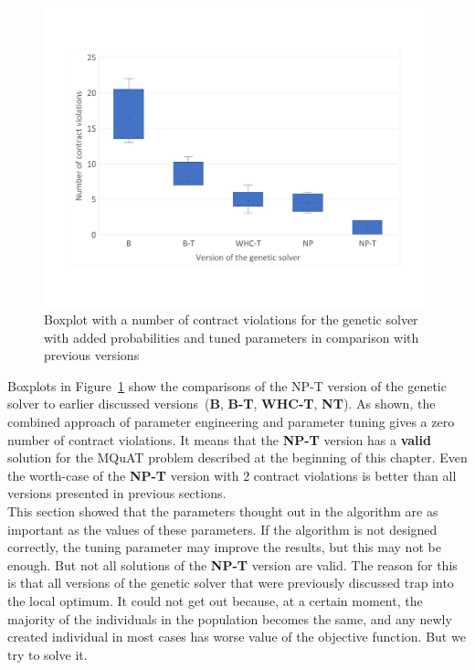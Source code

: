 \begin{figure}
	\centering
	\includegraphics[width=\textwidth]{images/BoxPlotSolverNewParametersTuning.pdf}
	\caption[Boxplot with a number of contract violations for the genetic solver with added probabilities and tuned parameters in comparison with previous versions]{Boxplot with a number of contract violations for the genetic solver with added probabilities and tuned parameters in comparison with previous versions}
	\label{fig:boxplotsolverNewParametersTuning}
\end{figure}

Boxplots in Figure~\ref{fig:boxplotsolverNewParametersTuning} show the comparisons of the NP-T version of the genetic solver to earlier discussed versions~(\textbf{B}, \textbf{B-T}, \textbf{WHC-T}, \textbf{NT}). As shown, the combined approach of parameter engineering and parameter tuning gives a zero number of contract violations. It means that the \textbf{NP-T} version has a \textbf{valid} solution for the MQuAT problem described at the beginning of this chapter. Even the worth-case of the \textbf{NP-T} version with 2 contract violations is better than all versions presented in previous sections. \\ 

This section showed that the parameters thought out in the algorithm are as important as the values of these parameters. If the algorithm is not designed correctly, the tuning parameter may improve the results, but this may not be enough. But not all solutions of the \textbf{NP-T} version are valid. The reason for this is that all versions of the genetic solver that were previously discussed trap into the local optimum.  It could not get out because, at a certain moment, the majority of the individuals in the population becomes the same, and any newly created individual in most cases has worse value of the objective function. But we try to solve it.

